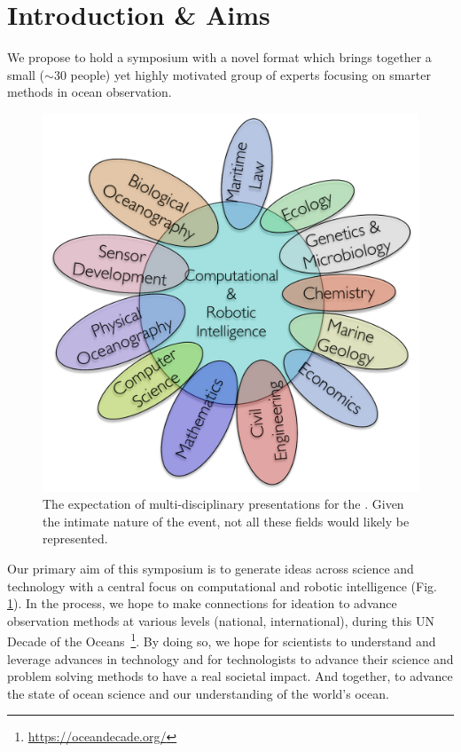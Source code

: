 \section{Introduction \& Aims}
\label{sec:intro}



\noindent
We propose to hold a symposium with a novel format which brings
together a small ($\sim 30$ people) yet highly motivated group of
experts focusing on smarter methods in ocean observation.%

\begin{figure}
  \vspace{-0.5cm}
  \centering 
  \includegraphics[scale=0.4]{fig/disciplines.pdf}
  \caption{The expectation of multi-disciplinary presentations for the
    \sympe. Given the intimate nature of the event, not all these
    fields would likely be represented.}
  \label{fig:concept}
  \vspace{-0.5cm}
\end{figure}

Our primary aim of this symposium is to generate ideas across science
and technology with a central focus on computational and robotic
intelligence (Fig. \ref{fig:concept}).  In the process, we hope to
make connections for ideation to advance observation methods at
various levels (national, international), during this \textsf{UN
  Decade of the Oceans}~\footnote{\url{https://oceandecade.org/}}. By
doing so, we hope for scientists to understand and leverage advances
in technology and for technologists to advance their science and
problem solving methods to have a real societal impact. And together,
to advance the state of ocean science and our understanding of the
world's ocean.

